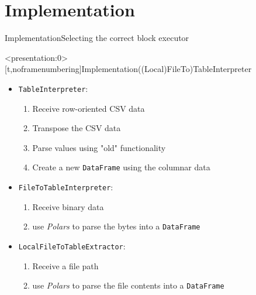 \section{Implementation}
\begin{frame}[t]{Implementation}{Selecting the correct block executor}
	\centering
	
	\pause
	\vfill
	
\end{frame}

\begin{frame}<presentation:0>[t,noframenumbering]{Implementation}{((Local)FileTo)TableInterpreter}
	\begin{itemize}[<+(1)->]
		\item \Verb|TableInterpreter|:
		      \begin{enumerate}
			      \item Receive row-oriented CSV data
			      \item Transpose the CSV data
			      \item Parse values using "old" functionality
			      \item Create a new \Verb|DataFrame| using the columnar data
		      \end{enumerate}
		\item \Verb|FileToTableInterpreter|:
		      \begin{enumerate}
			      \item Receive binary data
			      \item use \emph{Polars} to parse the bytes into a \Verb|DataFrame|
		      \end{enumerate}
		\item \Verb|LocalFileToTableExtractor|:
		      \begin{enumerate}
			      \item Receive a file path
			      \item use \emph{Polars} to parse the file contents into a \Verb|DataFrame|
		      \end{enumerate}
	\end{itemize}
\end{frame}

